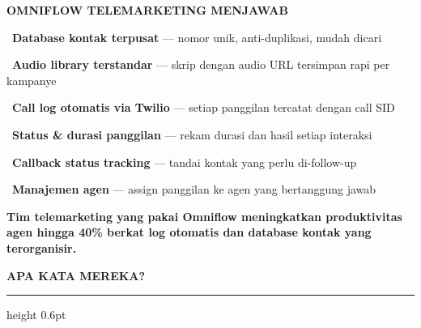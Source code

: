 \documentclass[a4paper]{article}
\newcommand{\sectiontitle}[1]{%
    \vspace{10pt}%
    {\fontsize{13}{16}\selectfont\bfseries\color{BlueDark} #1}\par\vspace{3pt}%
    {\color{BluePrimary}\hrule height 0.6pt}\par\vspace{8pt}%
}
\begin{document}
\begin{minipage}[t]{0.485\textwidth}
    \colorbox{CrimsonPrimary}{%
        \begin{minipage}{\dimexpr\textwidth-14pt}
            \vspace{5pt}
            {\fontsize{10}{13}\selectfont\bfseries\color{White} OMNIFLOW TELEMARKETING MENJAWAB}
            \vspace{5pt}
        \end{minipage}}
    \vspace{6pt}

    {\fontsize{9.5}{13}\selectfont\color{TextDark}%
    \textbullet\ \textbf{Database kontak terpusat} --- nomor unik, anti-duplikasi, mudah dicari\par\vspace{4pt}%
    \textbullet\ \textbf{Audio library terstandar} --- skrip dengan audio URL tersimpan rapi per kampanye\par\vspace{4pt}%
    \textbullet\ \textbf{Call log otomatis via Twilio} --- setiap panggilan tercatat dengan call SID\par\vspace{4pt}%
    \textbullet\ \textbf{Status \& durasi panggilan} --- rekam durasi dan hasil setiap interaksi\par\vspace{4pt}%
    \textbullet\ \textbf{Callback status tracking} --- tandai kontak yang perlu di-follow-up\par\vspace{4pt}%
    \textbullet\ \textbf{Manajemen agen} --- assign panggilan ke agen yang bertanggung jawab}%
\end{minipage}

\vspace{8pt}

{\setlength{\fboxsep}{7pt}\setlength{\fboxrule}{0pt}%
\noindent\colorbox{CrimsonPrimary}{%
    \begin{minipage}{\dimexpr\textwidth-2\fboxsep\relax}
        \centering
        {\fontsize{9.5}{12}\selectfont\bfseries\color{White}
        Tim telemarketing yang pakai Omniflow meningkatkan \textbf{produktivitas agen hingga 40\%} berkat log otomatis dan database kontak yang terorganisir.}
    \end{minipage}}}

\vspace{8pt}
\sectiontitle{APA KATA MEREKA?}
\end{document}
